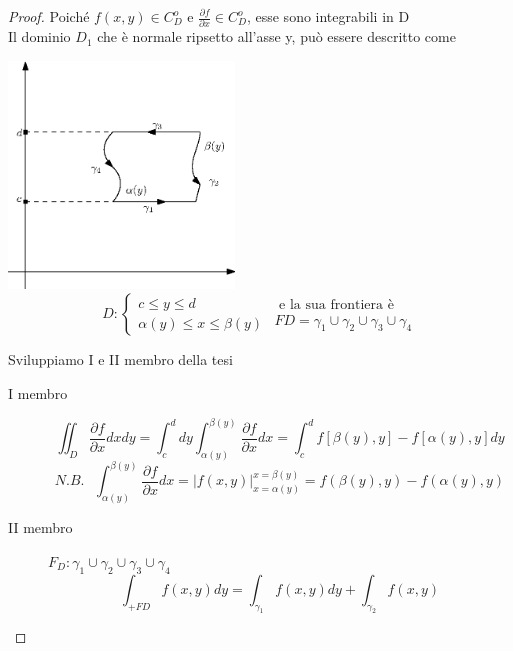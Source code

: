 \documentclass{book}
\begin{document}
\begin{proof}
	Poiché $f(x,y)\in C^o_D$ e $\frac{\partial f}{\partial x}\in C^o_D$, esse
	sono integrabili in D\\
	Il dominio $D_1$ che è normale ripsetto all'asse y, può essere descritto
	come 
	\begin{multicols}{2}
		\includegraphics[width=6cm]{img/finiti/primaLeggeGreenGauss.eps}\\
		\begin{equation*}
			D:\begin{cases}
				c\leq y\leq d\\
				\alpha(y) \leq x \leq \beta (y)
			\end{cases} 
			\begin{matrix}
				\text{ e la sua frontiera è }\\ FD=\gamma_1\cup\gamma_2
			\cup \gamma_3 \cup \gamma_4
			\end{matrix}
		\end{equation*}
	\end{multicols}
	Sviluppiamo I e II membro della tesi
	\begin{description}
		\item[I membro] 
			\begin{equation*}
				\iint_{D} \frac{\partial f}{\partial x} dxdy=\int_{c}^{d}
				dy\int_{\alpha(y)}^{\beta(y)}\frac{\partial f}{\partial x} dx=
				\int_{c}^{d} f[\beta(y),y]-f[\alpha(y),y] dy
			\end{equation*}
			\begin{equation*}
				N.B.\text{ } \int_{\alpha (y)}^{\beta (y)} \frac{\partial
				f}{\partial x} dx=\left| f(x,y) \right|^{x=\beta(y)}_{x=\alpha
				(y)}=f(\beta(y),y)-f(\alpha(y), y)
			\end{equation*}
		\item[II membro]
			$F_D: \gamma_1 \cup \gamma_2 \cup \gamma_3 \cup\gamma_4$
			\begin{equation}
				\int_{+FD}f(x,y)dy=\int_{\gamma_1}f(x,y)dy+\int_{\gamma_2}f(x,y)

\end{equation}
\end{description}
\end{proof}
\end{document}

